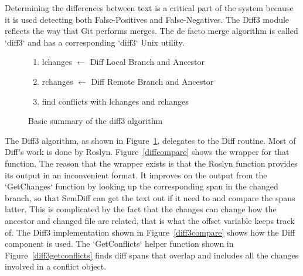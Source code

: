 \documentclass[draftclsnofoot,onecolumn]{IEEEtran}
\begin{document}
Determining the differences between text is a critical part of the system 
because it is used detecting both False-Positives and False-Negatives. The 
Diff3 module reflects the way that Git performs merges. The de facto merge 
algorithm is called `diff3` and has a corresponding `diff3` Unix utility. 

\begin{figure}[!t]
\centering
\begin{enumerate}
    \item lchanges $\leftarrow$ Diff Local Branch and Ancestor
    \item rchanges $\leftarrow$ Diff Remote Branch and Ancestor
    \item find conflicts with lchanges and rchanges
\end{enumerate}
\caption{Basic summary of the diff3 algorithm}
\label{diff3algorithm}
\end{figure}


The Diff3 algorithm, as shown in Figure~\ref{diff3algorithm}, delegates to 
the Diff routine. Most of Diff’s work is done by Roslyn. 
Figure~\ref{diffcompare} shows the wrapper for that function. The reason that 
the wrapper exists is that the Roslyn function provides its output in an 
inconvenient format. It improves on the output from the `GetChanges` function 
by looking up the corresponding span in the changed branch, so that SemDiff 
can get the text out if it need to and compare the spans latter. This is 
complicated by the fact that the changes can change how the ancestor and 
changed file are related, that is what the offset variable keeps track of. 
The Diff3 implementation shown in Figure~\ref{diff3compare} shows how the 
Diff component is used. The `GetConflicts` helper function shown in 
Figure~\ref{diff3getconflicts} finds diff spans that overlap and includes all 
the changes involved in a conflict object.
\end{document}
